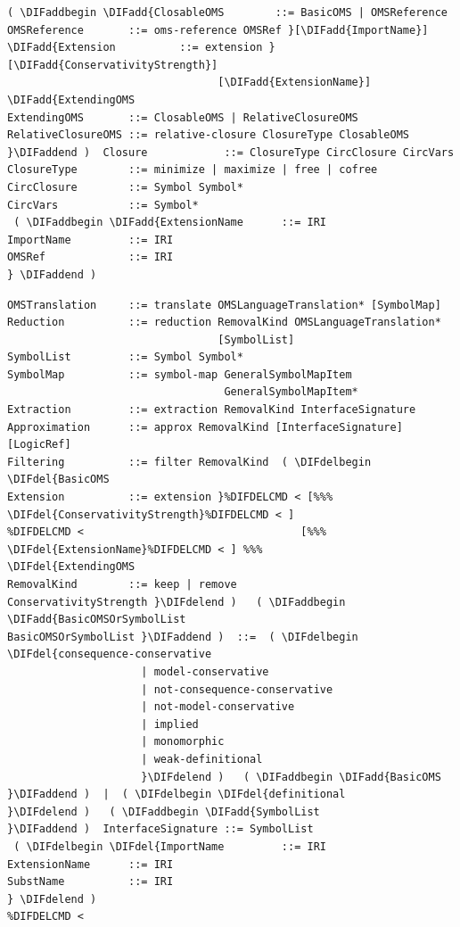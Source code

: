 \documentclass[10pt,fleqn,final]{scrreprt}
\newcommand*{\syntax}[1]{\texttt{#1}}
\newenvironment{definitions}[0]{\medskip }{}
\providecommand{\DIFadd}[1]{{\protect\color{blue}\uwave{#1}}} %
\providecommand{\DIFdel}[1]{{\protect\color{red}\sout{#1}}}                      %
\providecommand{\DIFaddbegin}{} %
\providecommand{\DIFaddend}{} %
\providecommand{\DIFdelbegin}{} %
\providecommand{\DIFdelend}{} %
\begin{document}
\begin{definitions}
\begin{lstlisting}[language=ebnf,escapeinside={()}]  %DIF >  abstract syntax
( \DIFaddbegin \DIFadd{ClosableOMS        ::= BasicOMS | OMSReference
OMSReference       ::= oms-reference OMSRef }[\DIFadd{ImportName}]
\DIFadd{Extension          ::= extension }[\DIFadd{ConservativityStrength}]
                                 [\DIFadd{ExtensionName}] \DIFadd{ExtendingOMS
ExtendingOMS       ::= ClosableOMS | RelativeClosureOMS
RelativeClosureOMS ::= relative-closure ClosureType ClosableOMS
}\DIFaddend )  Closure            ::= ClosureType CircClosure CircVars
ClosureType        ::= minimize | maximize | free | cofree
CircClosure        ::= Symbol Symbol*
CircVars           ::= Symbol*
 ( \DIFaddbegin \DIFadd{ExtensionName      ::= IRI
ImportName         ::= IRI
OMSRef             ::= IRI
} \DIFaddend )
\end{lstlisting}


\begin{lstlisting}[language=ebnf,escapeinside={()}]  %DIF >  abstract syntax
OMSTranslation     ::= translate OMSLanguageTranslation* [SymbolMap]
Reduction          ::= reduction RemovalKind OMSLanguageTranslation*
                                 [SymbolList]
SymbolList         ::= Symbol Symbol*
SymbolMap          ::= symbol-map GeneralSymbolMapItem
                                  GeneralSymbolMapItem*
Extraction         ::= extraction RemovalKind InterfaceSignature
Approximation      ::= approx RemovalKind [InterfaceSignature] [LogicRef]
Filtering          ::= filter RemovalKind  ( \DIFdelbegin \DIFdel{BasicOMS
Extension          ::= extension }%DIFDELCMD < [%%%
\DIFdel{ConservativityStrength}%DIFDELCMD < ]
%DIFDELCMD <                                  [%%%
\DIFdel{ExtensionName}%DIFDELCMD < ] %%%
\DIFdel{ExtendingOMS
RemovalKind        ::= keep | remove
ConservativityStrength }\DIFdelend )   ( \DIFaddbegin \DIFadd{BasicOMSOrSymbolList
BasicOMSOrSymbolList }\DIFaddend )  ::=  ( \DIFdelbegin \DIFdel{consequence-conservative
                     | model-conservative
                     | not-consequence-conservative
                     | not-model-conservative
                     | implied
                     | monomorphic
                     | weak-definitional
                     }\DIFdelend )   ( \DIFaddbegin \DIFadd{BasicOMS }\DIFaddend )  |  ( \DIFdelbegin \DIFdel{definitional
}\DIFdelend )   ( \DIFaddbegin \DIFadd{SymbolList
}\DIFaddend )  InterfaceSignature ::= SymbolList
 ( \DIFdelbegin \DIFdel{ImportName         ::= IRI
ExtensionName      ::= IRI
SubstName          ::= IRI
} \DIFdelend )
%DIFDELCMD < 
\end{lstlisting}


\end{definitions}
\end{document}
